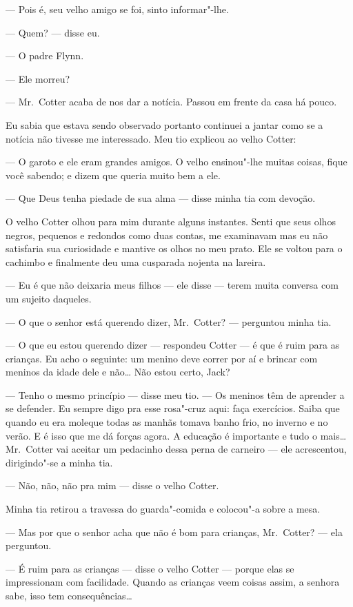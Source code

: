 --- Pois é, seu velho amigo se foi, sinto informar"-lhe.

--- Quem? --- disse eu.

--- O padre Flynn.

--- Ele morreu?

--- Mr.~Cotter acaba de nos dar a notícia.  Passou em frente da casa há pouco.

Eu sabia que estava sendo observado portanto continuei a jantar como se a
notícia não tivesse me interessado.  Meu tio explicou ao velho Cotter:

--- O garoto e ele eram grandes amigos.  O velho ensinou"-lhe muitas coisas,
fique você sabendo; e dizem que queria muito bem a ele.

--- Que Deus tenha piedade de sua alma --- disse minha tia com devoção.

O velho Cotter olhou para mim durante alguns instantes.  Senti que seus olhos
negros, pequenos e redondos como duas contas, me examinavam mas eu não
satisfaria sua curiosidade e mantive os olhos no meu prato.  Ele se voltou para
o cachimbo e finalmente deu uma cusparada nojenta na lareira.

--- Eu é que não deixaria meus filhos --- ele disse --- terem muita conversa
com um sujeito daqueles.

--- O que o senhor está querendo dizer, Mr.~Cotter? --- perguntou minha tia.

--- O que eu estou querendo dizer --- respondeu Cotter --- é que é ruim
para as crianças.  Eu acho o seguinte: um menino deve correr por aí e brincar
com meninos da idade dele e não\ldots{} Não estou certo, Jack?

--- Tenho o mesmo princípio --- disse meu tio.  --- Os meninos têm de aprender
a se defender.  Eu sempre digo pra esse rosa"-cruz aqui: faça exercícios.  Saiba
que quando eu era moleque todas as manhãs tomava banho frio, no inverno e no
verão.  E é isso que me dá forças agora.  A educação é importante e tudo o
mais\ldots{} Mr.~Cotter vai aceitar um pedacinho dessa perna de carneiro ---
ele acrescentou, dirigindo"-se a minha tia.

--- Não, não, não pra mim --- disse o velho Cotter.

Minha tia retirou a travessa do guarda"-comida e colocou"-a sobre a mesa.

--- Mas por que o senhor acha que não é bom para crianças, Mr.~Cotter?  ---
ela perguntou.

--- É ruim para as crianças --- disse o velho Cotter --- porque elas se
impressionam com facilidade.  Quando as crianças veem coisas assim, a senhora
sabe, isso tem consequências\ldots{}

